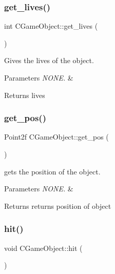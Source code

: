 \subsubsection{\texorpdfstring{get\+\_\+lives()}{get\_lives()}}
{\footnotesize\ttfamily int C\+Game\+Object\+::get\+\_\+lives (\begin{DoxyParamCaption}{ }\end{DoxyParamCaption})\hspace{0.3cm}{\ttfamily [inline]}}



Gives the lives of the object. 


\begin{DoxyParams}{Parameters}
{\em N\+O\+N\+E.} & \\
\hline
\end{DoxyParams}
\begin{DoxyReturn}{Returns}
lives 
\end{DoxyReturn}
\hypertarget{class_c_game_object_a065bd87e038fcbf7c84694a426b16773}{}\label{class_c_game_object_a065bd87e038fcbf7c84694a426b16773} 
\subsubsection{\texorpdfstring{get\+\_\+pos()}{get\_pos()}}
{\footnotesize\ttfamily Point2f C\+Game\+Object\+::get\+\_\+pos (\begin{DoxyParamCaption}{ }\end{DoxyParamCaption})\hspace{0.3cm}{\ttfamily [inline]}}



gets the position of the object. 


\begin{DoxyParams}{Parameters}
{\em N\+O\+N\+E.} & \\
\hline
\end{DoxyParams}
\begin{DoxyReturn}{Returns}
returns position of object 
\end{DoxyReturn}
\hypertarget{class_c_game_object_ab66892d3d3db14c4b7e427f341c949dd}{}\label{class_c_game_object_ab66892d3d3db14c4b7e427f341c949dd} 
\subsubsection{\texorpdfstring{hit()}{hit()}}
{\footnotesize\ttfamily void C\+Game\+Object\+::hit (\begin{DoxyParamCaption}{ }\end{DoxyParamCaption})}



